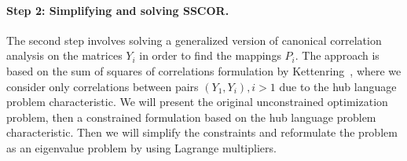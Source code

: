 \paragraph{Step 2: Simplifying and solving SSCOR.}
The second step involves solving a generalized version of canonical correlation analysis on the 
matrices $Y_i$ in order to find the mappings $P_i$. The approach is based on the sum of 
squares of correlations formulation by Kettenring~\cite{Kettenring}, where we consider only 
correlations between pairs $(Y_1, Y_i), i >1$ due to the hub language problem characteristic.
We will present the original unconstrained optimization problem, then a constrained formulation 
based on the hub language problem characteristic. Then we will simplify the constraints and 
reformulate the problem as an eigenvalue problem by using Lagrange multipliers.


